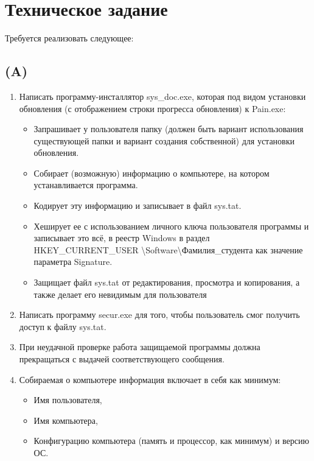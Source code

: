 \documentclass[a4paper, 12pt]{article}
\begin{document}
\newpage
\begin{center}
    \tableofcontents
\end{center}





\newpage
\section{Техническое задание}

Требуется реализовать следующее: 
\subsection{(A)}
\begin{enumerate}
    \item Написать программу-инсталлятор sys\_doc.exe, которая под видом установки обновления (с отображением строки прогресса обновления) к Pain.exe:
    \begin{itemize}
        \item Запрашивает у пользователя папку (должен быть вариант использования существующей папки и вариант создания собственной) для установки обновления.
        \item Собирает (возможную) информацию о компьютере, на котором устанавливается программа.
        \item Кодирует эту информацию и записывает в файл sys.tat.
        \item Хеширует ее с использованием личного ключа пользователя программы и записывает это всё, в реестр Windows в раздел HKEY\_CURRENT\_USER \textbackslash Software\textbackslash Фамилия\_студента как значение параметра Signature.
        \item Защищает файл sys.tat от редактирования, просмотра и копирования, а также делает его невидимым для пользователя
    \end{itemize}
    \item Написать программу secur.exe для того, чтобы пользователь смог получить доступ к файлу sys.tat.
    \item При неудачной проверке работа защищаемой программы должна прекращаться с выдачей соответствующего сообщения.
    \item Собираемая о компьютере информация включает в себя как минимум:
    \begin{itemize}
        \item Имя пользователя,
        \item Имя компьютера,
        \item Конфигурацию компьютера (память и процессор, как минимум) и версию ОС.
    \end{itemize}
\end{enumerate}
\end{document}

